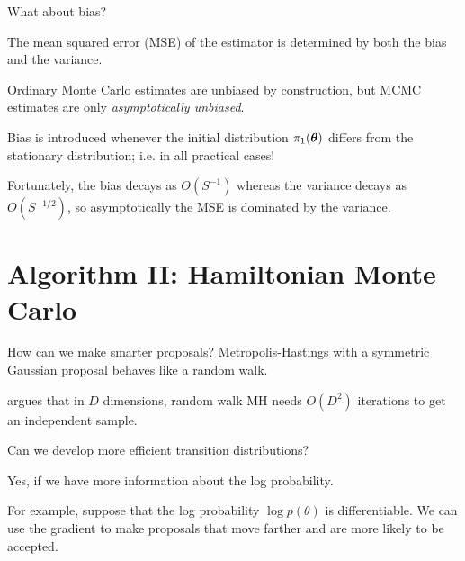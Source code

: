 \documentclass[aspectratio=169]{beamer}
\begin{document}
\begin{frame}{What about bias?}

The mean squared error (MSE) of the estimator is determined by both the bias and the variance.

Ordinary Monte Carlo estimates are unbiased by construction, but MCMC estimates are only \textit{asymptotically unbiased}.

Bias is introduced whenever the initial distribution $\pi_1(\boldsymbol{\theta})$ differs from the stationary distribution; i.e. in all practical cases!

Fortunately, the bias decays as $O(S^{-1})$ whereas the variance decays as $O(S^{-1/2})$, so asymptotically the MSE is dominated by the variance. 
    
\end{frame}



\section{Algorithm II: Hamiltonian Monte Carlo}
\label{sec:hmc}

\begin{frame}{How can we make smarter proposals?}
    Metropolis-Hastings with a symmetric Gaussian proposal behaves like a random walk.
    
    \citet{Neal2012-ev} argues that in $D$ dimensions, random walk MH needs $O(D^2)$ iterations to get an independent sample. 
    
    Can we develop more efficient transition distributions?
    
    Yes, if we have more information about the log probability. 
    
    For example, suppose that the log probability $\log p(\theta)$ is differentiable. We can use the gradient to make proposals that move farther and are more likely to be accepted.
\end{frame}

\end{document}
